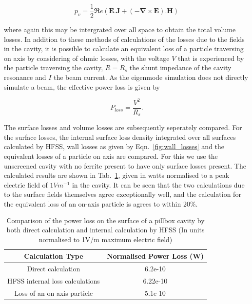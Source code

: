 \begin{equation}
p_{v}=\frac{1}{2}\Re{}e\left( \mathbf{E}.\mathbf{J} + \left( -\mathbf{\nabla} \times \mathbf{E} \right).\mathbf{H} \right) 
\label{eqn:vol_loss_density}
\end{equation}

where again this may be intergrated over all space to obtain the total volume losses. In addition to these methods of calculations of the losses due to the fields in the cavity, it is possible to calculate an equivalent loss of a particle traversing on axis by considering of ohmic losses, with the voltage $V$ that is experienced by the particle traversing the cavity, $R = R_{s}$ the shunt impedance of the cavity resonance and $I$ the beam current. As the eigenmode simulation does not directly simulate a beam, the effective power loss is given by 

\begin{equation}
P_{loss} = \frac{V^{2}}{R_{s}}.
\end{equation}

The surface losses and volume losses are subsequently seperately compared. For the surface losses, the internal surface loss density integrated over all surfaces calculated by HFSS, wall losses as given by Eqn.~\ref{fig:wall_losses} and the equivalent losses of a particle on axis are compared. For this we use the unscreened cavity with no ferrite present to have only surface losses present. The calculated results are shown in Tab.~\ref{tab:surface_losses_ferr}, given in watts normalised to a peak electric field of $1 V m^{-1}$ in the cavity. It can be seen that the two calculations due to the surface fields themselves agree exceptionally well, and the calculation for the equivalent loss of an on-axis particle is agrees to within 20\%. 

\begin{table}
\caption{Comparison of the power loss on the surface of a pillbox cavity by both direct calculation and internal calculation by HFSS (In units normalised to 1V/m maximum electric field)}
\begin{center}
\begin{tabular}{c | c }
Calculation Type & Normalised Power Loss (W)\\ \hline
Direct calculation & 6.2e-10\\ \hline
HFSS internal loss calculations & 6.22e-10 \\ \hline
Loss of an on-axis particle	 & 5.1e-10 \\
\end{tabular}
\end{center}
\label{tab:surface_losses_ferr}
\end{table}

